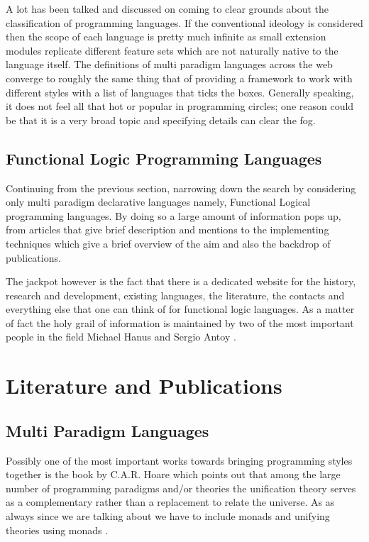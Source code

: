 \documentclass[thesis-solanki.tex]{subfiles}
\begin{document}
  A lot has been talked and discussed on coming to clear grounds about the classification of programming languages.
  If the conventional ideology is considered then the scope of each language is pretty much infinite as small
  extension modules replicate different feature sets which are not naturally native to the language itself.
  The definitions of multi paradigm languages across the web
  \cite{website:wikimultiparadigm,website:mdn,website:blogc2} converge to roughly the same thing that of providing
  a framework to work with different styles with a list of languages \cite{website:wikimpllist,website:dmoz} that
  ticks the boxes.
  Generally speaking, it does not feel all that hot or popular in programming circles; one reason could be that it
  is a very broad topic and specifying details can clear the fog.

\subsection{Functional Logic Programming Languages}

  Continuing from the previous section, narrowing down the search by considering only multi paradigm declarative
  languages namely, Functional Logical programming languages.
  By doing so a large amount of information pops up, from articles that give brief description and mentions
  \cite{website:wikiflpl, website:wikiflpllist} to the implementing techniques \cite{website:imlpementingflpl}
  which give a brief overview of the aim and also the backdrop of publications.

  The jackpot however is the fact that there is a dedicated website \cite{website:funclogprog} for the history,
  research and development, existing languages, the literature, the contacts and everything else that one can think
  of for functional logic languages.
  As a matter of fact the holy grail of information is maintained by two of the most important people in the field
  Michael Hanus \cite{website:mhanus} and Sergio Antoy \cite{website:santoy}.




\section{Literature and Publications}
\subsection{Multi Paradigm Languages}
  Possibly one of the most important works towards bringing programming styles together is the book by C.A.R.
  Hoare \cite{hoare1998unifying} which points out that among the large number of programming paradigms and/or
  theories the unification theory serves as a complementary rather than a replacement to relate the universe.
  As as always since we are talking about  we have to include monads and unifying theories using
  monads \cite{gibbons2013unifying}.
 
\end{document}
